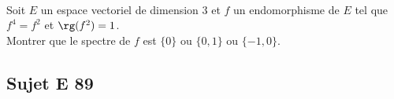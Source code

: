 \documentclass[11pt]{article}
\begin{document}
\begin{exerciceSP}~\\
Soit $E$ un espace vectoriel de dimension $3$ et $f$ un endomorphisme 
de $E$ tel que $f^4=f^2$ et $\rg(f^2)=1$.\\
Montrer que le spectre de $f$ est $\{0\}$ ou $\{0,1\}$ ou $\{-1,0\}$.
\end{exerciceSP}


\newpage


\subsection*{Sujet E 89}

\end{document}
